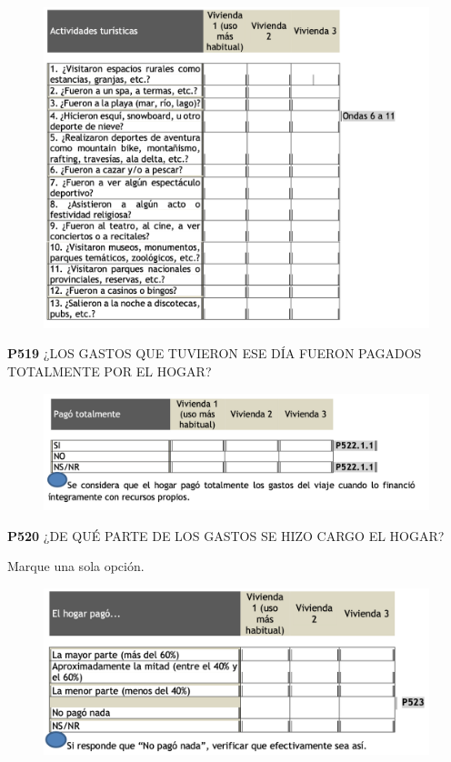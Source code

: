 \documentclass[
  openany]{book}
\begin{document}
\begin{figure}

{\centering \includegraphics[width=1\linewidth]{imagenes/figura6-200} 

}

\end{figure}

\textbf{P519} ¿LOS GASTOS QUE TUVIERON ESE DÍA FUERON PAGADOS TOTALMENTE POR EL HOGAR?

\begin{figure}

{\centering \includegraphics[width=1\linewidth]{imagenes/figura6-201} 

}

\end{figure}

\textbf{P520} ¿DE QUÉ PARTE DE LOS GASTOS SE HIZO CARGO EL HOGAR?

Marque una sola opción.

\begin{figure}

{\centering \includegraphics[width=1\linewidth]{imagenes/figura6-202} 

}

\end{figure}
\end{document}
